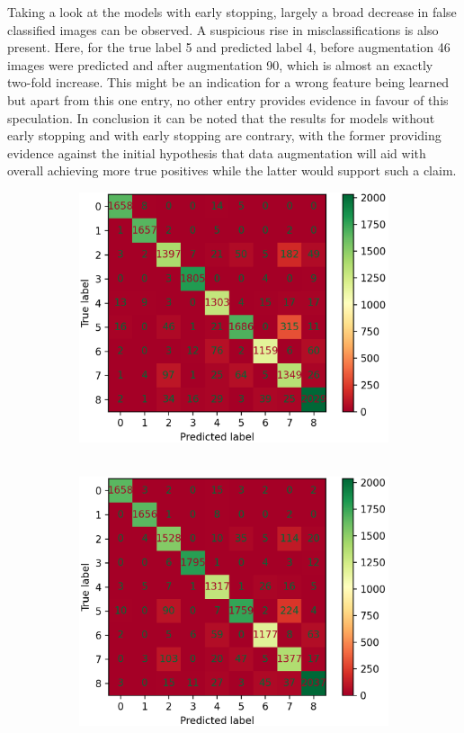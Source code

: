 Taking a look at the models with early stopping, largely a broad decrease in false classified images can be observed. A suspicious rise in misclassifications is also present. Here, for the true label 5 and  predicted label 4, before augmentation 46 images were predicted and after augmentation 90, which is almost an exactly two-fold increase. This might be an indication for a wrong feature being learned but apart from this one entry, no other entry provides evidence in favour of this speculation. In conclusion it can be noted that the results for models without early stopping and with early stopping are contrary, with the former providing evidence against the initial hypothesis that data augmentation will aid with overall achieving more true positives while the latter would support such a claim.
\begin{figure}[ht]
	\centering
	\begin{subfigure}{0.45\columnwidth}
		\includegraphics[width=\columnwidth]{./figures/Alex_4_with_balancing_conf_matrix_cropped.png}
		~\label{fig:noaugmentationearly}
	\end{subfigure}
	\begin{subfigure}{0.45\columnwidth}
		\includegraphics[width=\columnwidth]{./figures/Alex_4_with_augment_conf_matrix_cropped.png}

\end{subfigure}
\end{figure}
